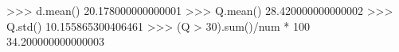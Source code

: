 
>>> d.mean()
20.178000000000001
>>> Q.mean()
28.420000000000002
>>> Q.std()
10.155865300406461
>>> (Q > 30).sum()/num * 100
34.200000000000003

